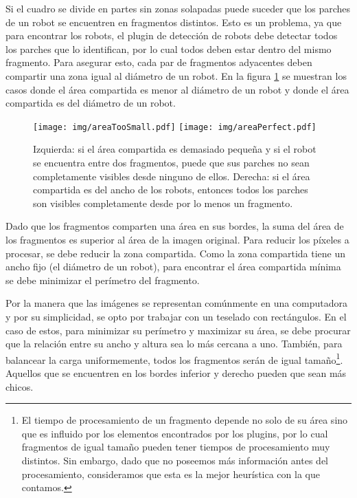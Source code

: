 Si el cuadro se divide en partes sin zonas solapadas puede suceder que los
parches de un robot se encuentren en fragmentos distintos. Esto es un problema,
ya que para encontrar los robots, el plugin de detección de robots debe detectar
todos los parches que lo identifican, por lo cual todos deben estar dentro del
mismo fragmento. Para asegurar esto, cada par de fragmentos adyacentes deben
compartir una zona igual al diámetro de un robot. En la figura
\ref{areaCompartida} se muestran los casos donde el área compartida es menor al
diámetro de un robot y donde el área compartida es del diámetro de un robot.

\begin{figure}[!h]

	\centering
	\texttt{[image: img/areaTooSmall.pdf]}
	\texttt{[image: img/areaPerfect.pdf]}

	\caption{Izquierda: si el área compartida es demasiado pequeña y si el
	robot se encuentra entre dos fragmentos, puede que sus parches no sean
	completamente visibles desde ninguno de ellos. Derecha: si el área
	compartida es del ancho de los robots, entonces todos los parches son
	visibles completamente desde por lo menos un fragmento.}

	\label{areaCompartida}

\end{figure}

Dado que los fragmentos comparten una área en sus bordes, la suma del área de
los fragmentos es superior al área de la imagen original. Para reducir los
píxeles a procesar, se debe reducir la zona compartida. Como la zona compartida
tiene un ancho fijo (el diámetro de un robot), para encontrar el área compartida
mínima se debe minimizar el perímetro del fragmento.

Por la manera que las imágenes se representan comúnmente en una computadora y
por su simplicidad, se opto por trabajar con un teselado con rectángulos. En el
caso de estos, para minimizar su perímetro y maximizar su área, se debe procurar
que la relación entre su ancho y altura sea lo más cercana a uno. También,
para balancear la carga uniformemente, todos los fragmentos serán de igual
tamaño\footnote{El tiempo de procesamiento de un fragmento depende no solo de su
área sino que es influido por los elementos encontrados por los plugins, por lo
cual fragmentos de igual tamaño pueden tener tiempos de procesamiento muy
distintos. Sin embargo, dado que no poseemos más información antes del
procesamiento, consideramos que esta es la mejor heurística con la que
contamos.}. Aquellos que se encuentren en los bordes inferior y derecho pueden
que sean más chicos.

